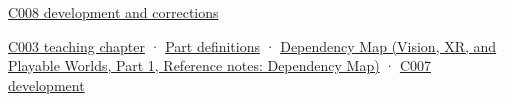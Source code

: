 \hypertarget{appendix-6af5921bc853-source-and-navigation}{}

\hyperref[appendix-fd090d982a15-m008---parts-113-126]{C008 development and corrections}

\hyperref[01-foundations-i-ch002-where-the-bytes-live]{C003 teaching chapter} · \hyperref[appendix-fd090d982a15-m003---parts-41-60]{Part definitions} · \href{../07-Vision-XR-and-Playable-Worlds-P01/main.pdf\#appendix-4ad47bdd269a}{Dependency Map (Vision, XR, and Playable Worlds, Part 1, Reference notes: Dependency Map)} · \hyperref[01-foundations-i-ch003-bringing-the-object-model-back-to-bytes]{C007 development}
